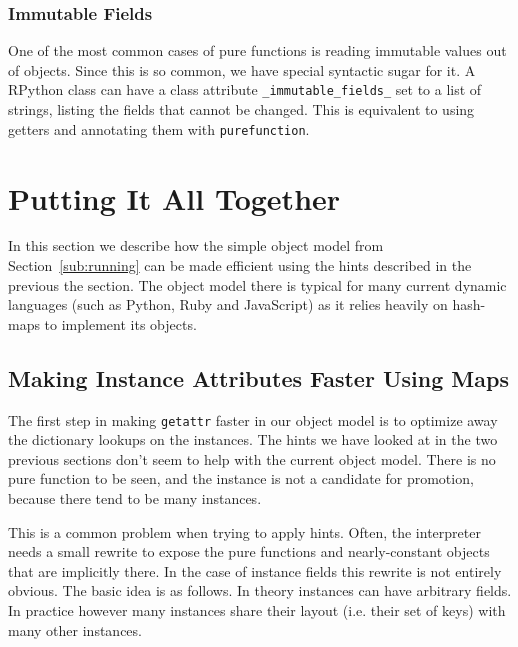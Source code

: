 \documentclass{sigplanconf}
\begin{document}
\subsubsection{Immutable Fields}

One of the most common cases of pure functions is reading immutable
values out of objects. Since this is so common, we have special syntactic sugar
for it. A RPython class can have a class attribute \texttt{\_immutable\_fields\_} set to
a list of strings, listing the fields that cannot be changed. This is equivalent
to using getters and annotating them with \texttt{purefunction}.





\section{Putting It All Together}
\label{sec:fastobjmodel}

In this section we describe how the simple object model from
Section~\ref{sub:running} can be made efficient using the hints described in the
previous the section. The object model there is typical for many current
dynamic languages (such as Python, Ruby and JavaScript) as it relies heavily on
hash-maps to implement its objects.


\subsection{Making Instance Attributes Faster Using Maps}

The first step in making \texttt{getattr} faster in our object model is to optimize
away the dictionary lookups on the instances. The hints we have looked at in the
two previous sections don't seem to help with the current object model. There is
no pure function to be seen, and the instance is not a candidate for promotion,
because there tend to be many instances.

This is a common problem when trying to apply hints. Often, the interpreter
needs a small rewrite to expose the pure functions and nearly-constant objects
that are implicitly there. In the case of instance fields this rewrite is not
entirely obvious. The basic idea is as follows. In theory instances can have
arbitrary fields. In practice however many instances share their layout (i.e.
their set of keys) with many other instances.
\end{document}
